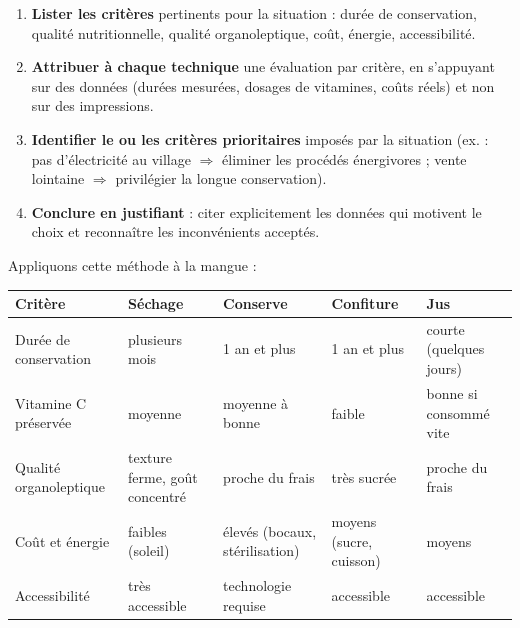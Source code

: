 \documentclass[11pt]{article}
\begin{document}
\begin{methode}
\begin{enumerate}
\item \textbf{Lister les critères} pertinents pour la situation : durée de conservation, qualité nutritionnelle, qualité organoleptique, coût, énergie, accessibilité.
\item \textbf{Attribuer à chaque technique} une évaluation par critère, en s'appuyant sur des données (durées mesurées, dosages de vitamines, coûts réels) et non sur des impressions.
\item \textbf{Identifier le ou les critères prioritaires} imposés par la situation (ex. : pas d'électricité au village $\Rightarrow$ éliminer les procédés énergivores ; vente lointaine $\Rightarrow$ privilégier la longue conservation).
\item \textbf{Conclure en justifiant} : citer explicitement les données qui motivent le choix et reconnaître les inconvénients acceptés.
\end{enumerate}
\end{methode}

Appliquons cette méthode à la mangue :

\begin{center}
\begin{tabularx}{\linewidth}{|l|X|X|X|X|}
\hline
\rowcolor{popblueL} \textbf{Critère} & \textbf{Séchage} & \textbf{Conserve} & \textbf{Confiture} & \textbf{Jus} \\
\hline
Durée de conservation & plusieurs mois & 1 an et plus & 1 an et plus & courte (quelques jours) \\
\hline
Vitamine C préservée & moyenne & moyenne à bonne & faible & bonne si consommé vite \\
\hline
Qualité organoleptique & texture ferme, goût concentré & proche du frais & très sucrée & proche du frais \\
\hline
Coût et énergie & faibles (soleil) & élevés (bocaux, stérilisation) & moyens (sucre, cuisson) & moyens \\
\hline
Accessibilité & très accessible & technologie requise & accessible & accessible \\
\hline
\end{tabularx}
\end{center}
\end{document}
